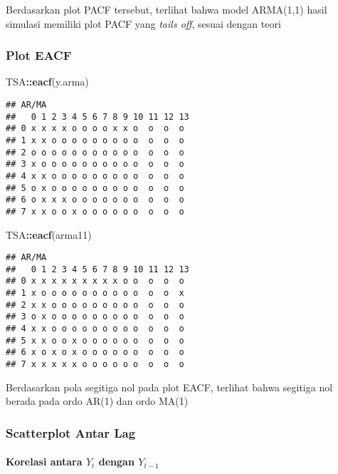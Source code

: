 \documentclass[
]{article}
\newenvironment{Shaded}{\begin{snugshade}}{\end{snugshade}}
\newcommand{\FunctionTok}[1]{\textcolor[rgb]{0.13,0.29,0.53}{\textbf{#1}}}
\newcommand{\NormalTok}[1]{#1}
\newcommand{\SpecialCharTok}[1]{\textcolor[rgb]{0.81,0.36,0.00}{\textbf{#1}}}
\begin{document}
Berdasarkan plot PACF tersebut, terlihat bahwa model ARMA(1,1) hasil
simulasi memiliki plot PACF yang \emph{tails off}, sesuai dengan teori

\subsubsection{Plot EACF}\label{plot-eacf-2}

\begin{Shaded}
\begin{Highlighting}[]
\NormalTok{TSA}\SpecialCharTok{::}\FunctionTok{eacf}\NormalTok{(y.arma)}
\end{Highlighting}
\end{Shaded}

\begin{verbatim}
## AR/MA
##   0 1 2 3 4 5 6 7 8 9 10 11 12 13
## 0 x x x x o o o o x x o  o  o  o 
## 1 x x o o o o o o o o o  o  o  o 
## 2 o o o o o o o o o o o  o  o  o 
## 3 x o o o o o o o o o o  o  o  o 
## 4 x x o o o o o o o o o  o  o  o 
## 5 o x o o o o o o o o o  o  o  o 
## 6 o x x x o o o o o o o  o  o  o 
## 7 x x o o x o o o o o o  o  o  o
\end{verbatim}

\begin{Shaded}
\begin{Highlighting}[]
\NormalTok{TSA}\SpecialCharTok{::}\FunctionTok{eacf}\NormalTok{(arma11)}
\end{Highlighting}
\end{Shaded}

\begin{verbatim}
## AR/MA
##   0 1 2 3 4 5 6 7 8 9 10 11 12 13
## 0 x x x x x x x x x o o  o  o  o 
## 1 x o o o o o o o o o o  o  o  x 
## 2 x x o o o o o o o o o  o  o  o 
## 3 o x o o o o o o o o o  o  o  o 
## 4 x x o o o o o o o o o  o  o  o 
## 5 x x o o x o o o o o o  o  o  o 
## 6 x o x o x o o o o o o  o  o  o 
## 7 x x x x x o o o o o o  o  o  o
\end{verbatim}

Berdasarkan pola segitiga nol pada plot EACF, terlihat bahwa segitiga
nol berada pada ordo AR(1) dan ordo MA(1)

\subsubsection{Scatterplot Antar Lag}\label{scatterplot-antar-lag-2}

\paragraph{\texorpdfstring{Korelasi antara \(Y_t\) dengan
\(Y_{t-1}\)}{Korelasi antara Y\_t dengan Y\_\{t-1\}}}\label{korelasi-antara-y_t-dengan-y_t-1-2}
\end{document}
